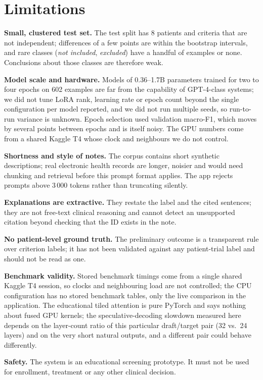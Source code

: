 \section{Limitations}
\textbf{Small, clustered test set.} The test split has 8 patients and \NTest{} criteria that are not independent; differences of a few points are within the bootstrap intervals, and rare classes (\emph{not included}, \emph{excluded}) have a handful of examples or none. Conclusions about those classes are therefore weak.

\textbf{Model scale and hardware.} Models of 0.36--1.7B parameters trained for two to four epochs on 602 examples are far from the capability of GPT-4-class systems; we did not tune LoRA rank, learning rate or epoch count beyond the single configuration per model reported, and we did not run multiple seeds, so run-to-run variance is unknown. Epoch selection used validation macro-F1, which moves by several points between epochs and is itself noisy. The GPU numbers come from a shared Kaggle T4 whose clock and neighbours we do not control.

\textbf{Shortness and style of notes.} The corpus contains short synthetic descriptions; real electronic health records are longer, noisier and would need chunking and retrieval before this prompt format applies. The app rejects prompts above 3\,000 tokens rather than truncating silently.

\textbf{Explanations are extractive.} They restate the label and the cited sentences; they are not free-text clinical reasoning and cannot detect an unsupported citation beyond checking that the ID exists in the note.

\textbf{No patient-level ground truth.} The preliminary outcome is a transparent rule over criterion labels; it has not been validated against any patient-trial label and should not be read as one.

\textbf{Benchmark validity.} Stored benchmark timings come from a single shared Kaggle T4 session, so clocks and neighbouring load are not controlled; the CPU configuration has no stored benchmark tables, only the live comparison in the application. The educational tiled attention is pure PyTorch and says nothing about fused GPU kernels; the speculative-decoding slowdown measured here depends on the layer-count ratio of this particular draft/target pair (32 vs.\ 24 layers) and on the very short natural outputs, and a different pair could behave differently.

\textbf{Safety.} The system is an educational screening prototype. It must not be used for enrollment, treatment or any other clinical decision.

